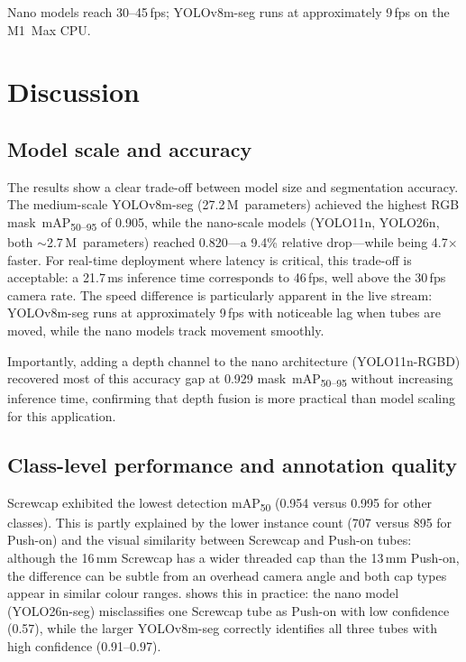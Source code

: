 \documentclass{Academic}
\begin{document}
Nano models reach 30--45\,fps; YOLOv8m-seg runs at approximately 9\,fps on the M1~Max CPU.

\section{Discussion}

\subsection{Model scale and accuracy}

The results show a clear trade-off between model size and segmentation accuracy. The medium-scale YOLOv8m-seg (27.2\,M~parameters) achieved the highest RGB mask~mAP\textsubscript{50--95} of 0.905, while the nano-scale models (YOLO11n, YOLO26n, both $\sim$2.7\,M~parameters) reached 0.820---a 9.4\% relative drop---while being 4.7$\times$ faster. For real-time deployment where latency is critical, this trade-off is acceptable: a 21.7\,ms inference time corresponds to 46\,fps, well above the 30\,fps camera rate. The speed difference is particularly apparent in the live stream: YOLOv8m-seg runs at approximately 9\,fps with noticeable lag when tubes are moved, while the nano models track movement smoothly.

Importantly, adding a depth channel to the nano architecture (YOLO11n-RGBD) recovered most of this accuracy gap at 0.929 mask~mAP\textsubscript{50--95} without increasing inference time, confirming that depth fusion is more practical than model scaling for this application.

\subsection{Class-level performance and annotation quality}

Screwcap exhibited the lowest detection mAP\textsubscript{50} (0.954 versus 0.995 for other classes). This is partly explained by the lower instance count (707 versus 895 for Push-on) and the visual similarity between Screwcap and Push-on tubes: although the 16\,mm Screwcap has a wider threaded cap than the 13\,mm Push-on, the difference can be subtle from an overhead camera angle and both cap types appear in similar colour ranges.  shows this in practice: the nano model (YOLO26n-seg) misclassifies one Screwcap tube as Push-on with low confidence (0.57), while the larger YOLOv8m-seg correctly identifies all three tubes with high confidence (0.91--0.97).
\end{document}

